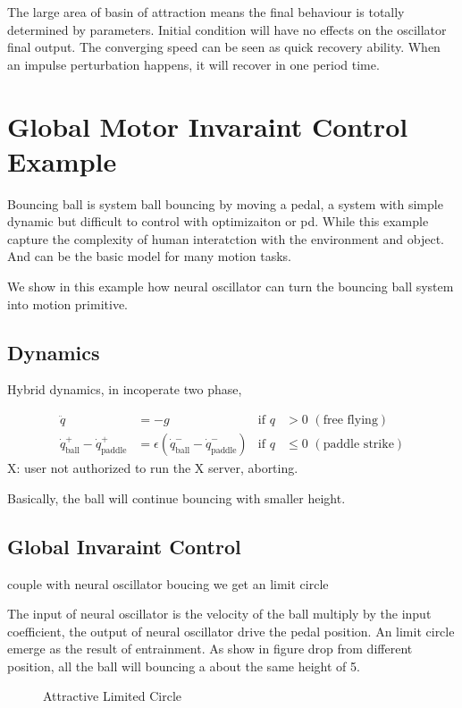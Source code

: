 The large area of basin of attraction means the final behaviour is totally determined by parameters. 
Initial condition will have no effects on the oscillator final output. 
The converging speed can be seen as quick recovery ability.
When an impulse perturbation happens, it will recover in one period time.


\section{Global Motor Invaraint Control Example}

Bouncing ball is system ball bouncing by moving a pedal, a system with simple dynamic but difficult to control with optimizaiton or pd. 
While this example capture the complexity of human interatction with the environment and object. 
And can be the basic model for many motion tasks.

We show in this example how neural oscillator can turn the bouncing ball system into motion primitive.
\subsection*{Dynamics}
Hybrid dynamics, in incoperate two phase, 
 

\begin{align}
\ddot{q}&=-g&\mathrm{if}\,\,q &> 0\,\,\mathrm{(free\,\,flying)} \nonumber\\
\dot{q}^{+}_{\mathrm{ball}} - \dot{q}^{+}_{\mathrm{paddle}} &=  \epsilon(\dot{q}^{-}_{\mathrm{ball}} - \dot{q}^{-}_{\mathrm{paddle}})&\mathrm{if}\,\,q &\leq 0\,\,\mathrm{(paddle\,\,strike)}\nonumber
\end{align}
X: user not authorized to run the X server, aborting.


Basically, the ball will continue bouncing with smaller height.


\subsection*{Global Invaraint Control}
couple with neural oscillator boucing we get an limit circle


The input of neural oscillator is the velocity of the ball multiply by the input coefficient, the output of neural oscillator  drive the pedal position.
An limit circle emerge as the result of entrainment.
As show in figure drop from different position, all the ball will bouncing a about the same height of 5.

\begin{figure}[h]
\begin{center}
	
\end{center}
\caption{Attractive Limited Circle}
\label{fig:bb_attractive_circle}
\end{figure}
